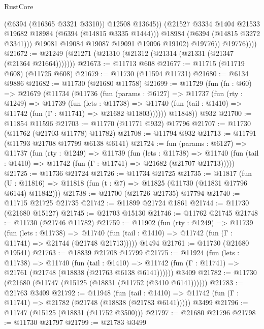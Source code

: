 \begin{lexlean}{RustCore}
\begin{coremodule}
                        (@6394 (@16365 @3321 @3310))
                        @12508
                        @13645))
                    (@21527 @3334 @1404 @21533 @19682 @18984 (@6394 (@14815 @3335 @1444)))
                    @18984
                    (@6394 (@14815 @3272 @3341)))
                  @19081
                  @19084
                  @19087
                  @19091
                  @19096
                  @19102)
                @19776))
            @19776))))
@21672 := @21249 (@21271 (@21310 (@21312 (@21314 (@21331 (@21347 (@21364 @21664)))))))
@21673 := @11713 @608
@21677 := @11715 (@11719 @608) (@11725 @608)
@21679 := @11730 (@11594 @11731)
@21680 := @6134 @9886
@21682 := @11730 (@21680 @11758)
@21699 := @11729
    (fun (fn : @60) =>
    @21679
      (@11734
        (@11736
          (fun (params : @6127) =>
          @11737
            (fun (rty : @1249) =>
            @11739
              (fun (lets : @11738) =>
              @11740 (fun (tail : @1410) => @11742 (fun (Γ : @11741) => @21682 @11803))))))
        @11848))
    @932
@21700 := @11854 @11596
@21703 := @11770 (@11771 @932) @17796
@21707 := @11730 (@11762 (@21703 @11778) @11782)
@21708 := @11794 @932
@21713 := @11791 (@11793 @21708 @17799 @6138 @6141)
@21724 := fun (params : @6127) =>
  @11737
    (fun (rty : @1249) =>
    @11739
      (fun (lets : @11738) =>
      @11740 (fun (tail : @1410) => @11742 (fun (Γ : @11741) => @21682 (@21707 @21713)))))
@21725 := @11736 @21724
@21726 := @11734 @21725
@21735 := @11817
    (fun (U : @11816) => @11818 (fun (t : @7) => @11825 (@11730 (@11831 @17796 @6144) @11842)))
@21738 := @21700 (@21726 @21735) @17794
@21740 := @11715 @21725 @21735
@21742 := @11899 @21724 @1861
@21744 := @11730 (@21680 @15127)
@21745 := @21703 @15130
@21746 := @11762 @21745
@21748 := @11730 (@21746 @11782)
@21759 := @11902
    (fun (rty : @1249) =>
    @11739
      (fun (lets : @11738) =>
      @11740 (fun (tail : @1410) => @11742 (fun (Γ : @11741) => @21744 (@21748 @21713)))))
    @1494
@21761 := @11730 (@21680 @19541)
@21763 := @18839 @21708 @17799
@21775 := @11924
    (fun (lets : @11738) =>
    @11740
      (fun (tail : @1410) =>
      @11742 (fun (Γ : @11741) => @21761 (@21748 (@18838 (@21763 @6138 @6141))))))
    @3409
@21782 := @11730 (@21680 (@11747 (@15125 (@18831 (@11752 (@3410 @6141))))))
@21783 := @21763 @3409
@21792 := @11948
    (fun (tail : @1410) => @11742 (fun (Γ : @11741) => @21782 (@21748 (@18838 (@21783 @6141)))))
    @3499
@21796 := @11747 (@15125 (@18831 (@11752 @3500)))
@21797 := @21680 @21796
@21798 := @11730 @21797
@21799 := @21783 @3499

\end{coremodule}
\end{lexlean}

